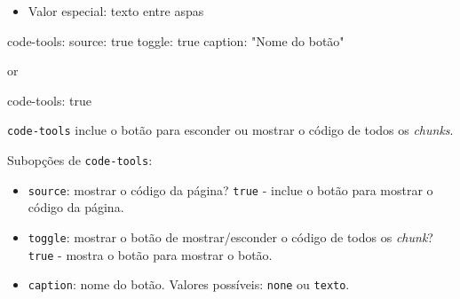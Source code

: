 \documentclass[
  10pt,
  ignorenonframetext,
]{beamer}
\newenvironment{Shaded}{\begin{snugshade}}{\end{snugshade}}
\newcommand{\AttributeTok}[1]{\textcolor[rgb]{0.40,0.45,0.13}{#1}}
\newcommand{\CharTok}[1]{\textcolor[rgb]{0.13,0.47,0.30}{#1}}
\newcommand{\FunctionTok}[1]{\textcolor[rgb]{0.28,0.35,0.67}{#1}}
\newcommand{\KeywordTok}[1]{\textcolor[rgb]{0.00,0.23,0.31}{#1}}
\newcommand{\StringTok}[1]{\textcolor[rgb]{0.13,0.47,0.30}{#1}}
\providecommand{\tightlist}{%
  \setlength{\itemsep}{0pt}\setlength{\parskip}{0pt}}\usepackage{longtable,booktabs,array}
\begin{document}
\begin{frame}[fragile]
\begin{itemize}
  \begin{itemize}
  \tightlist
  \item
    Valor especial: texto entre aspas
  \end{itemize}
\end{itemize}
\end{frame}

\begin{frame}[fragile]
\begin{Shaded}
\begin{Highlighting}[]
\FunctionTok{code{-}tools}\KeywordTok{:}
\AttributeTok{  }\FunctionTok{source}\KeywordTok{:}\AttributeTok{ }\CharTok{true}
\AttributeTok{  }\FunctionTok{toggle}\KeywordTok{:}\AttributeTok{ }\CharTok{true}
\AttributeTok{  }\FunctionTok{caption}\KeywordTok{:}\AttributeTok{ }\StringTok{"Nome do botão"}
\end{Highlighting}
\end{Shaded}

or

\begin{Shaded}
\begin{Highlighting}[]
\FunctionTok{code{-}tools}\KeywordTok{:}\AttributeTok{ }\CharTok{true}
\end{Highlighting}
\end{Shaded}

\texttt{code-tools} inclue o botão para esconder ou mostrar o código de
todos os \emph{chunks}.

Subopções de \texttt{code-tools}:

\begin{itemize}
\tightlist
\item
  \texttt{source}: mostrar o código da página? \texttt{true} - inclue o
  botão para mostrar o código da página.
\item
  \texttt{toggle}: mostrar o botão de mostrar/esconder o código de todos
  os \emph{chunk}? \texttt{true} - mostra o botão para mostrar o botão.
\item
  \texttt{caption}: nome do botão. Valores possíveis: \texttt{none} ou
  \texttt{texto}.
\end{itemize}
\end{frame}
\end{document}
